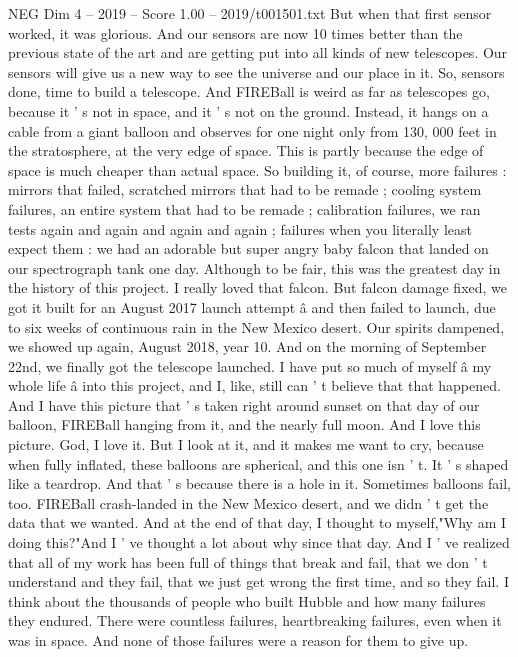 \begin{textsample}{NEG Dim 4 – 2019 – Score 1.00 – 2019/t001501.txt}
But when that first sensor worked, it was glorious.
And our sensors are now 10 times better than the previous state of the art and are getting put into all kinds of new telescopes.
Our sensors will give us a new way to see the universe and our place in it.
So, sensors done, time to build a telescope.
And FIREBall is weird as far as telescopes go, because it ' s not in space, and it ' s not on the ground.
Instead, it hangs on a cable from a giant balloon and observes for one night only from 130, 000 feet in the stratosphere, at the very edge of space.
This is partly because the edge of space is much cheaper than actual space.
So building it, of course, more failures : mirrors that failed, scratched mirrors that had to be remade ; cooling system failures, an entire system that had to be remade ; calibration failures, we ran tests again and again and again and again ; failures when you literally least expect them : we had an adorable but super angry baby falcon that landed on our spectrograph tank one day.
Although to be fair, this was the greatest day in the history of this project.
I really loved that falcon.
But falcon damage fixed, we got it built for an August 2017 launch attempt â and then failed to launch, due to six weeks of continuous rain in the New Mexico desert.
Our spirits dampened, we showed up again, August 2018, year 10.
And on the morning of September 22nd, we finally got the telescope launched.
I have put so much of myself â my whole life â into this project, and I, like, still can ' t believe that that happened.
And I have this picture that ' s taken right around sunset on that day of our balloon, FIREBall hanging from it, and the nearly full moon.
And I love this picture.
God, I love it.
But I look at it, and it makes me want to cry, because when fully inflated, these balloons are spherical, and this one isn ' t.
It ' s shaped like a teardrop.
And that ' s because there is a hole in it.
Sometimes balloons fail, too.
FIREBall crash-landed in the New Mexico desert, and we didn ' t get the data that we wanted.
And at the end of that day, I thought to myself,"Why am I doing this?"And I ' ve thought a lot about why since that day.
And I ' ve realized that all of my work has been full of things that break and fail, that we don ' t understand and they fail, that we just get wrong the first time, and so they fail.
I think about the thousands of people who built Hubble and how many failures they endured.
There were countless failures, heartbreaking failures, even when it was in space.
And none of those failures were a reason for them to give up.

\end{textsample}
